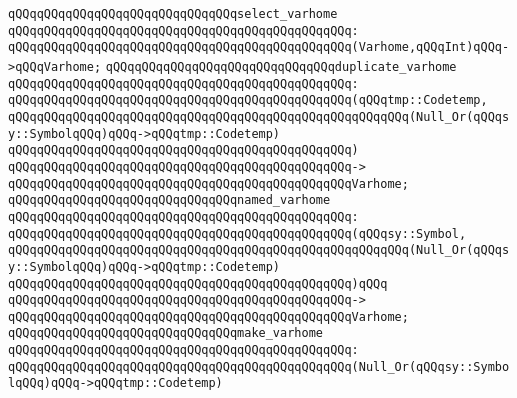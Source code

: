 \newline
\verb|qQQqqQQqqQQqqQQqqQQqqQQqqQQqqQQqselect_varhome|\newline
\verb|qQQqqQQqqQQqqQQqqQQqqQQqqQQqqQQqqQQqqQQqqQQqqQQq:|\newline
\verb|qQQqqQQqqQQqqQQqqQQqqQQqqQQqqQQqqQQqqQQqqQQqqQQq(Varhome,qQQqInt)qQQq->qQQqVarhome;|\newline
\newline
\newline
\verb|qQQqqQQqqQQqqQQqqQQqqQQqqQQqqQQqduplicate_varhome|\newline
\verb|qQQqqQQqqQQqqQQqqQQqqQQqqQQqqQQqqQQqqQQqqQQqqQQq:|\newline
\verb|qQQqqQQqqQQqqQQqqQQqqQQqqQQqqQQqqQQqqQQqqQQqqQQq(qQQqtmp::Codetemp,|\newline
\verb|qQQqqQQqqQQqqQQqqQQqqQQqqQQqqQQqqQQqqQQqqQQqqQQqqQQqqQQq(Null_Or(qQQqsy::SymbolqQQq)qQQq->qQQqtmp::Codetemp)|\newline
\verb|qQQqqQQqqQQqqQQqqQQqqQQqqQQqqQQqqQQqqQQqqQQqqQQq)|\newline
\verb|qQQqqQQqqQQqqQQqqQQqqQQqqQQqqQQqqQQqqQQqqQQqqQQq->|\newline
\verb|qQQqqQQqqQQqqQQqqQQqqQQqqQQqqQQqqQQqqQQqqQQqqQQqVarhome;|\newline
\newline
\newline
\verb|qQQqqQQqqQQqqQQqqQQqqQQqqQQqqQQqnamed_varhome|\newline
\verb|qQQqqQQqqQQqqQQqqQQqqQQqqQQqqQQqqQQqqQQqqQQqqQQq:|\newline
\verb|qQQqqQQqqQQqqQQqqQQqqQQqqQQqqQQqqQQqqQQqqQQqqQQq(qQQqsy::Symbol,|\newline
\verb|qQQqqQQqqQQqqQQqqQQqqQQqqQQqqQQqqQQqqQQqqQQqqQQqqQQqqQQq(Null_Or(qQQqsy::SymbolqQQq)qQQq->qQQqtmp::Codetemp)|\newline
\verb|qQQqqQQqqQQqqQQqqQQqqQQqqQQqqQQqqQQqqQQqqQQqqQQq)qQQq|\newline
\verb|qQQqqQQqqQQqqQQqqQQqqQQqqQQqqQQqqQQqqQQqqQQqqQQq->|\newline
\verb|qQQqqQQqqQQqqQQqqQQqqQQqqQQqqQQqqQQqqQQqqQQqqQQqVarhome;|\newline
\newline
\newline
\verb|qQQqqQQqqQQqqQQqqQQqqQQqqQQqqQQqmake_varhome|\newline
\verb|qQQqqQQqqQQqqQQqqQQqqQQqqQQqqQQqqQQqqQQqqQQqqQQq:|\newline
\verb|qQQqqQQqqQQqqQQqqQQqqQQqqQQqqQQqqQQqqQQqqQQqqQQq(Null_Or(qQQqsy::SymbolqQQq)qQQq->qQQqtmp::Codetemp)|\newline
